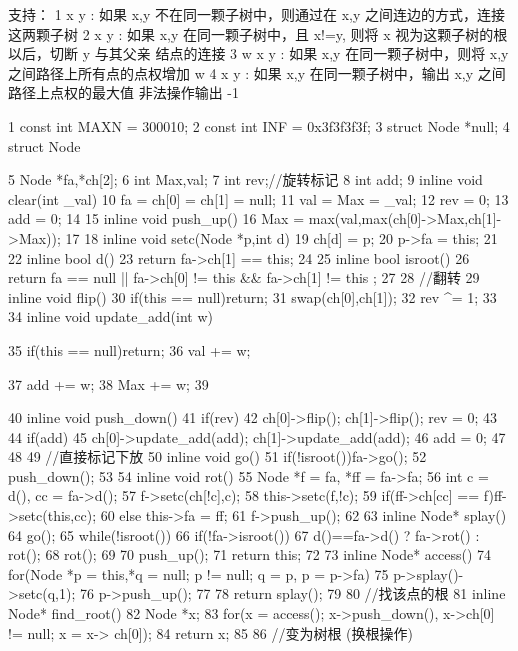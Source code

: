 \documentclass[11pt]{article}
\begin{document}
\begin{Code}
     支持：
     1 x y : 如果 x,y 不在同一颗子树中，则通过在 x,y 之间连边的方式，连接这两颗子树
     2 x y : 如果 x,y 在同一颗子树中，且 x!=y, 则将 x 视为这颗子树的根以后，切断 y 与其父亲
     结点的连接
     3 w x y : 如果 x,y 在同一颗子树中，则将 x,y 之间路径上所有点的点权增加 w
     4 x y : 如果 x,y 在同一颗子树中，输出 x,y 之间路径上点权的最大值
     非法操作输出 -1

 1   const int MAXN = 300010;
 2   const int INF = 0x3f3f3f3f;
 3   struct Node *null;
 4   struct Node{
 5       Node *fa,*ch[2];
 6       int Max,val;
 7       int rev;//旋转标记
 8       int add;
 9       inline void clear(int _val){
10           fa = ch[0] = ch[1] = null;
11           val = Max = _val;
12           rev = 0;
13           add = 0;
14       }
15       inline void push_up(){
16           Max = max(val,max(ch[0]->Max,ch[1]->Max));
17       }
18       inline void setc(Node *p,int d){
19           ch[d] = p;
20           p->fa = this;
21       }
22       inline bool d(){
23           return fa->ch[1] == this;
24       }
25       inline bool isroot(){
26           return fa == null || fa->ch[0] != this && fa->ch[1] != this
                ;
27       }
28       //翻转
29       inline void flip(){
30           if(this == null)return;
31           swap(ch[0],ch[1]);
32           rev ^= 1;
33       }
34       inline void update_add(int w){
35           if(this == null)return;
36           val += w;


37              add += w;
38              Max += w;
39       }
40       inline void push_down(){
41           if(rev){
42               ch[0]->flip(); ch[1]->flip(); rev = 0;
43           }
44           if(add){
45               ch[0]->update_add(add); ch[1]->update_add(add);
46               add = 0;
47           }
48       }
49       //直接标记下放
50       inline void go(){
51           if(!isroot())fa->go();
52           push_down();
53       }
54       inline void rot(){
55           Node *f = fa, *ff = fa->fa;
56           int c = d(), cc = fa->d();
57           f->setc(ch[!c],c);
58           this->setc(f,!c);
59           if(ff->ch[cc] == f)ff->setc(this,cc);
60           else this->fa = ff;
61           f->push_up();
62       }
63       inline Node* splay(){
64           go();
65           while(!isroot()){
66               if(!fa->isroot())
67                    d()==fa->d() ? fa->rot() : rot();
68               rot();
69           }
70           push_up();
71           return this;
72       }
73       inline Node* access(){
74           for(Node *p = this,*q = null; p != null; q = p, p = p->fa){
75               p->splay()->setc(q,1);
76               p->push_up();
77           }
78           return splay();
79       }
80       //找该点的根
81       inline Node* find_root(){
82           Node *x;
83           for(x = access(); x->push_down(), x->ch[0] != null; x = x->
                ch[0]);
84           return x;
85       }
86       //变为树根 (换根操作)


}
\end{Code}
\end{document}
